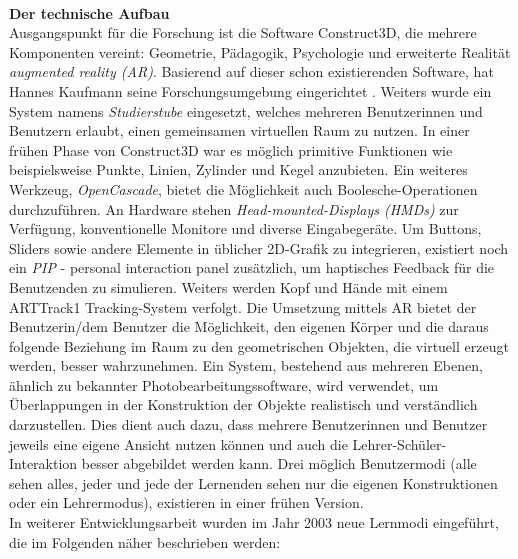 \documentclass[deutsch]{llncs}
\begin{document}
\noindent \\
\textbf{Der technische Aufbau} \\
Ausgangspunkt für die Forschung ist die Software Construct3D, die mehrere Komponenten vereint: Geometrie, Pädagogik, Psychologie und erweiterte Realität \emph{augmented reality (AR)}.
Basierend auf dieser schon existierenden Software, hat Hannes Kaufmann seine Forschungsumgebung eingerichtet \cite{Kaufmann:2002:MGE:1242073.1242086}. 
Weiters wurde ein System namens \emph{Studierstube} eingesetzt, welches mehreren Benutzerinnen und Benutzern erlaubt, einen gemeinsamen virtuellen Raum zu nutzen.
In einer frühen Phase von Construct3D war es möglich primitive Funktionen wie beispielsweise Punkte, Linien, Zylinder und Kegel anzubieten.
Ein weiteres Werkzeug, \emph{OpenCascade}, bietet die Möglichkeit auch Boolesche-Operationen durchzuführen.
An Hardware stehen \emph{Head-mounted-Displays (HMDs)} zur 
Verfügung, konventionelle Monitore und diverse Eingabegeräte. Um Buttons, Sliders sowie andere Elemente in üblicher 2D-Grafik zu integrieren, existiert noch ein \emph{PIP} - personal interaction panel zusätzlich, um haptisches Feedback für die Benutzenden zu simulieren. Weiters werden Kopf und Hände mit einem ARTTrack1 Tracking-System verfolgt.
Die Umsetzung mittels AR bietet der Benutzerin/dem Benutzer die Möglichkeit, den eigenen Körper und die daraus folgende Beziehung im Raum zu den geometrischen Objekten, die virtuell erzeugt werden,
besser wahrzunehmen. 
Ein System, bestehend aus mehreren Ebenen, ähnlich zu bekannter Photobearbeitungssoftware, wird verwendet, um Überlappungen in der Konstruktion der Objekte realistisch und verständlich darzustellen. Dies dient auch dazu, dass mehrere Benutzerinnen und Benutzer jeweils eine eigene Ansicht nutzen können und auch die Lehrer-Schüler-Interaktion besser abgebildet werden kann. 
Drei möglich Benutzermodi (alle sehen alles, jeder und jede der Lernenden sehen nur die eigenen Konstruktionen oder ein Lehrermodus), existieren in einer frühen Version. \\
In weiterer Entwicklungsarbeit wurden im Jahr 2003 neue Lernmodi eingeführt, die im Folgenden näher beschrieben werden: \\
\noindent \\
\end{document}
